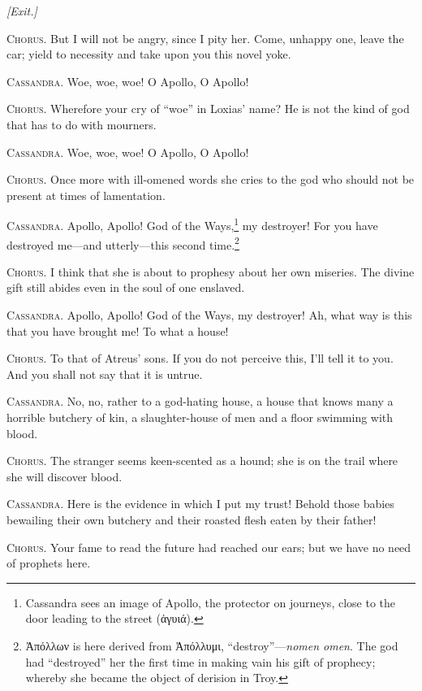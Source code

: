 \documentclass[12pt]{article}
\begin{document}
\begin{center}
\textit{[Exit.]}
\end{center}

\textsc{Chorus.} But I will not be angry, since I pity her. Come, unhappy one, leave the car; yield to necessity and take upon you this novel yoke.

\textsc{Cassandra.} Woe, woe, woe! O Apollo, O Apollo!

\textsc{Chorus.} Wherefore your cry of ``woe'' in Loxias' name? He is not the kind of god that has to do with mourners.

\textsc{Cassandra.} Woe, woe, woe! O Apollo, O Apollo!

\textsc{Chorus.} Once more with ill-omened words she cries to the god who should not be present at times of lamentation.

\textsc{Cassandra.} Apollo, Apollo! God of the Ways,\footnote{Cassandra sees an image of Apollo, the protector on journeys, close to the door leading to the street (ἀγυιά).} my destroyer! For you have destroyed me---and utterly---this second time.\footnote{Ἀπόλλων is here derived from Ἀπόλλυμι, ``destroy''---\textit{nomen omen}. The god had ``destroyed'' her the first time in making vain his gift of prophecy; whereby she became the object of derision in Troy.}

\textsc{Chorus.} I think that she is about to prophesy about her own miseries. The divine gift still abides even in the soul of one enslaved.

\textsc{Cassandra.} Apollo, Apollo! God of the Ways, my destroyer! Ah, what way is this that you have brought me! To what a house!

\textsc{Chorus.} To that of Atreus' sons. If you do not perceive this, I'll tell it to you. And you shall not say that it is untrue.

\textsc{Cassandra.} No, no, rather to a god-hating house, a house that knows many a horrible butchery of kin, a slaughter-house of men and a floor swimming with blood.

\textsc{Chorus.} The stranger seems keen-scented as a hound; she is on the trail where she will discover blood.

\textsc{Cassandra.} Here is the evidence in which I put my trust! Behold those babies bewailing their own butchery and their roasted flesh eaten by their father!

\textsc{Chorus.} Your fame to read the future had reached our ears; but we have no need of prophets here.
\end{document}
